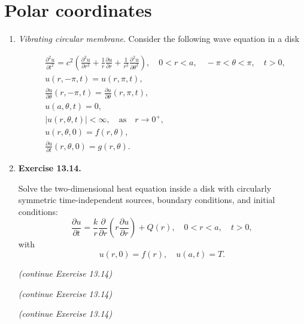 \newpage

\section{Polar coordinates}

\begin{enumerate}

    \item \textit{Vibrating circular membrane}. Consider the following wave equation in a disk

    \[
    \begin{aligned}
        & \frac{\partial^{2} u}{\partial t^{2}}  = c^{2}\left( \frac{\partial^{2} u}{\partial r^{2}} + \frac{1}{r}\frac{\partial u}{\partial r} + \frac{1}{r^{2}}\frac{\partial^{2} u}{\partial \theta^{2}} \right), \quad 0 < r < a, \quad -\pi < \theta < \pi, \quad t>0, \\
        & u(r, -\pi, t) = u(r, \pi, t), \\
        & \frac{\partial u}{\partial \theta}(r, -\pi,t) = \frac{\partial u}{\partial \theta}(r, \pi,t), \\
        & u(a, \theta, t) = 0, \\
        & |u(r,\theta ,t)|<\infty, \quad \text{as} \quad r\to 0^{+},\\
        & u(r,\theta, 0) = f(r,\theta), \\
        & \frac{\partial u}{\partial t} (r, \theta, 0) = g(r, \theta).
    \end{aligned}
    \]

\newpage

\item \textbf{Exercise 13.14.}

Solve the two-dimensional heat equation inside a disk with circularly symmetric time-independent sources, boundary conditions, and initial conditions:
\[\frac{\partial u}{\partial t} = \frac{k}{r}\frac{\partial}{\partial r}\left( r \frac{\partial u}{\partial r} \right) + Q(r) , \quad 0<r<a, \quad t>0,\]
with
\[u(r,0) = f(r), \quad u(a,t)=T.\]

\newpage 

\textit{(continue Exercise 13.14)}

\newpage 

\textit{(continue Exercise 13.14)}

\newpage 

\textit{(continue Exercise 13.14)}

% 
% 
% 
% 
% 
% 


\end{enumerate}




